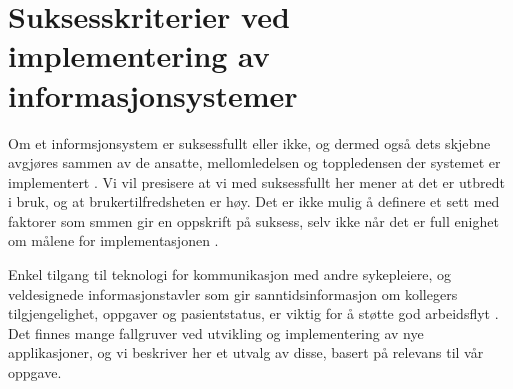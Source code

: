 \section{Suksesskriterier ved implementering av informasjonsystemer}
\label{chp: suksesskriterier}

Om et informsjonsystem er suksessfullt eller ikke, og dermed også dets skjebne avgjøres sammen av de ansatte, mellomledelsen og toppledensen der systemet er implementert \cite{Berg01}. Vi vil presisere at  vi med suksessfullt her mener at det er utbredt i bruk, og at brukertilfredsheten er høy. Det er ikke mulig å definere et sett med faktorer som smmen gir en oppskrift på suksess, selv ikke når det er full enighet om målene for implementasjonen \cite{Berg01}.

\noindent
Enkel tilgang til teknologi for kommunikasjon med andre sykepleiere, og veldesignede informasjonstavler som gir sanntidsinformasjon om kollegers tilgjengelighet, oppgaver og pasientstatus, er viktig for å støtte god arbeidsflyt \cite{Ebright10}. 
Det finnes  mange fallgruver ved utvikling og implementering av nye applikasjoner, og vi beskriver her et utvalg av disse, basert på relevans til vår oppgave.


